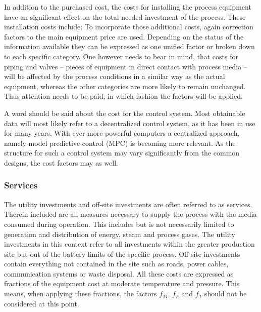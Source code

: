         In addition to the purchased cost, the costs for installing the process equipment have an significant effect
        on the total needed investment of the process. These installation costs include:
        To incorporate those additional costs, again correction factors to the main equipment price are used.
        Depending on the status
        of the information available they can be expressed as one unified factor or broken down to each specific
        category. One however needs to bear in mind, that costs for piping and valves -- pieces of equipment
        in direct contact with process media -- will be affected by the process conditions in a similar
        way as the actual equipment, whereas the other categories are more likely to remain unchanged. Thus
        attention needs to be paid, in which fashion the factors will be applied.

        A word should be said about the cost for the control system. Most obtainable data will most likely refer to
        a decentralized control system, as it has been in use for many years. With ever more powerful computers
        a centralized approach, namely model predictive control (MPC) is becoming more relevant. As the
        structure for such a control system may vary significantly from the common designs, the cost factors may
        as well. 

    \subsubsection{Services}
        The utility investments and off-site investments are often referred to as services. Therein included are
        all measures necessary to supply the process with the media consumed during operation. This includes but is
        not necessarily limited to generation and distribution of energy, steam and process gases. The utility investments
        in this context refer to all investments within the greater production site but out of the battery limits of the
        specific process. Off-site investments contain everything not contained in the site such as roads, power cables,
        communication systems or waste disposal. All these costs are expressed as fractions of the equipment
        cost at moderate temperature and pressure. This means, when applying these fractions, the factors $f_M$,
        $f_P$ and $f_T$ should not be considered at this point.

